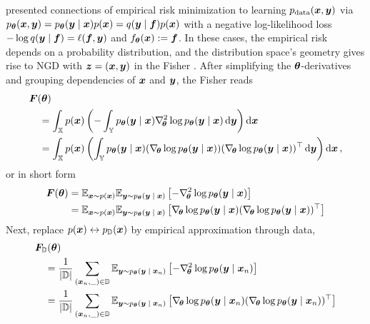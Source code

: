  presented connections of
empirical risk minimization to learning $p_{\mathrm{data}}({\bm{x}}, {\bm{y}})$ via $p_{{\bm{\theta}}}({\bm{x}},
{\bm{y}}) = p_{{\bm{\theta}}}({\bm{y}}\;|\;{\bm{x}}) p({\bm{x}}) = q({\bm{y}}\;|\;{\bm{f}}) p({\bm{x}})
$ with a negative log-likelihood loss $-\log q({\bm{y}}\;|\;{\bm{f}}) = \ell({\bm{f}},
{\bm{y}})$ and $f_{{\bm{\theta}}}({\bm{x}}):= {\bm{f}}$. In these cases, the empirical risk
 depends on a probability distribution, and
the distribution space's geometry gives rise to NGD with ${\bm{z}} = ({\bm{x}}, {\bm{y}})$ in
the Fisher . After simplifying the
${\bm{\theta}}$-derivatives and grouping dependencies of ${\bm{x}}$ and ${\bm{y}}$, the Fisher
reads
\begin{align*}
  &{\bm{F}}({\bm{\theta}})
    \\
  &\quad =
    \int_{{\mathbb{X}}} p({\bm{x}})
    \left(
    - \int_{{\mathbb{Y}}} p_{{\bm{\theta}}}({\bm{y}}\;|\;{\bm{x}})
    \nabla_{\!{{\bm{\theta}}}}^{2} \log p_{{\bm{\theta}}}({\bm{y}}\;|\;{\bm{x}})
    \,\mathrm{d}{\bm{y}}
    \right)
    \mathrm{d}{\bm{x}}
  \\
  &\quad = \int_{{\mathbb{X}}}
    p({\bm{x}})
    \left(
    \int_{{\mathbb{Y}}}
    p_{{\bm{\theta}}}({\bm{y}}\;|\;{\bm{x}})
    (\nabla_{\!{{\bm{\theta}}}} \log p_{{\bm{\theta}}}({\bm{y}}\;|\;{\bm{x}}))
    (\nabla_{\!{{\bm{\theta}}}} \log p_{{\bm{\theta}}}({\bm{y}}\;|\;{\bm{x}}))^{\top}
    \,\mathrm{d}{\bm{y}}
    \right)
    \mathrm{d}{\bm{x}}\,,
\end{align*}
or in short form
\begin{align}
  \label{eq:background::FisherExpectationForms}
  \begin{split}
    {\bm{F}}({\bm{\theta}})
    &= \mathbb{E}_{{\bm{x}} \sim p({\bm{x}})}
      \mathbb{E}_{{\bm{y}} \sim p_{{\bm{\theta}}}({\bm{y}}\;|\;{\bm{x}})}
      \left[
      - \nabla_{\!{{\bm{\theta}}}}^{2} \log p_{{\bm{\theta}}}({\bm{y}}\;|\;{\bm{x}})
      \right]
    \\
    &=
      \mathbb{E}_{{\bm{x}} \sim p({\bm{x}})}
      \mathbb{E}_{{\bm{y}} \sim p_{{\bm{\theta}}}({\bm{y}}\;|\;{\bm{x}})}
      \left[
      \nabla_{\!{{\bm{\theta}}}} \log p_{{\bm{\theta}}}({\bm{y}}\;|\;{\bm{x}})
      (\nabla_{\!{{\bm{\theta}}}} \log p_{{\bm{\theta}}}({\bm{y}}\;|\;{\bm{x}}))^{\top}
      \right]
  \end{split}
\end{align}
Next, replace $p({\bm{x}}) \leftrightarrow p_{{\mathbb{D}}}({\bm{x}})$ by empirical approximation
through data,
\begin{align}\label{eq:background::FisherExpectationDifferentPerspectives}
  \begin{split}
    &{\bm{F}}_{{\mathbb{D}}}({\bm{\theta}})
    \\
    &\quad=
      \frac{1}{|{\mathbb{D}}|}
      \sum_{({\bm{x}}_n, \_) \in {\mathbb{D}}}
      \mathbb{E}_{{\bm{y}} \sim p_{{\bm{\theta}}}({\bm{y}}\;|\;{\bm{x}}_n)}
      \left[
      - \nabla_{\!{{\bm{\theta}}}}^{2} \log p_{{\bm{\theta}}}({\bm{y}}\;|\;{\bm{x}}_n)
      \right]
    \\
    &\quad=
      \frac{1}{|{\mathbb{D}}|}
      \sum_{({\bm{x}}_n, \_) \in {\mathbb{D}}}
      \mathbb{E}_{{\bm{y}} \sim p_{{\bm{\theta}}}({\bm{y}}\;|\;{\bm{x}}_n)}
      \left[
      \nabla_{\!{{\bm{\theta}}}} \log p_{{\bm{\theta}}}({\bm{y}}\;|\;{\bm{x}}_n)
      (\nabla_{\!{{\bm{\theta}}}} \log p_{{\bm{\theta}}}({\bm{y}}\;|\;{\bm{x}}_n))^{\top}
      \right]
  \end{split}
\end{align}

